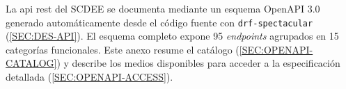 La \acs{api} \acs{rest} del SCDEE se documenta mediante un esquema
OpenAPI 3.0 generado automáticamente desde el código fuente con
\texttt{drf-spectacular} (\cref{SEC:DES-API}). El esquema completo
expone 95 \textit{endpoints} agrupados en 15 categorías funcionales.
Este anexo resume el catálogo (\cref{SEC:OPENAPI-CATALOG}) y describe
los medios disponibles para acceder a la especificación detallada
(\cref{SEC:OPENAPI-ACCESS}).
